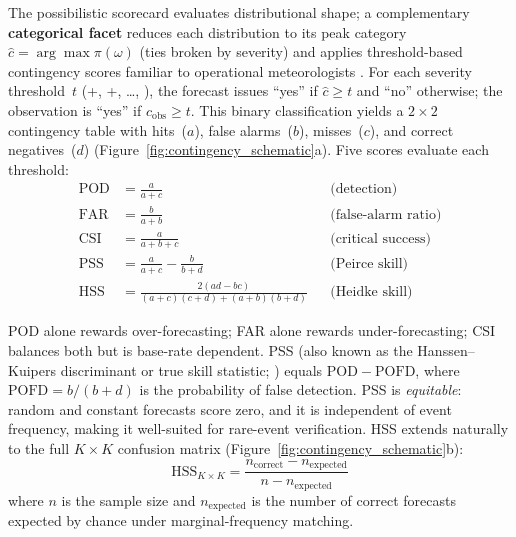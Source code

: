 The possibilistic scorecard evaluates distributional shape;
a complementary \textbf{categorical facet} reduces each
distribution to its peak category
$\hat{c} = \arg\max \pi(\omega)$ (ties broken by severity)
and applies threshold-based contingency scores familiar to
operational meteorologists
\citep{Jolliffe2003-xs,Wilks2011-vw}.
For each severity threshold~$t$ (+, +,
\ldots, ), the forecast issues ``yes'' if
$\hat{c} \geq t$ and ``no'' otherwise; the observation is
``yes'' if $c_{\mathrm{obs}} \geq t$.
This binary classification yields a $2 \times 2$ contingency
table with hits~($a$), false alarms~($b$), misses~($c$),
and correct negatives~($d$)
(Figure~\ref{fig:contingency_schematic}a).
Five scores evaluate each threshold:
\begin{align}
\mathrm{POD}  &= \frac{a}{a + c}
    &&\text{(detection)} \label{eq:pod} \\
\mathrm{FAR}  &= \frac{b}{a + b}
    &&\text{(false-alarm ratio)} \label{eq:far} \\
\mathrm{CSI}  &= \frac{a}{a + b + c}
    &&\text{(critical success)} \label{eq:csi} \\
\mathrm{PSS}  &= \frac{a}{a+c} - \frac{b}{b+d}
    &&\text{(Peirce skill)} \label{eq:pss} \\
\mathrm{HSS}  &= \frac{2(ad - bc)}{(a{+}c)(c{+}d) + (a{+}b)(b{+}d)}
    &&\text{(Heidke skill)} \label{eq:hss}
\end{align}

POD alone rewards over-forecasting; FAR alone rewards
under-forecasting; CSI balances both but is base-rate
dependent.
PSS (also known as the Hanssen--Kuipers discriminant or
true skill statistic; \citealt{Wilks2011-vw}) equals
$\mathrm{POD} - \mathrm{POFD}$,
where $\mathrm{POFD} = b/(b+d)$ is the probability of
false detection.
PSS is \textit{equitable}: random and constant forecasts
score zero, and it is independent of event frequency,
making it well-suited for rare-event verification.
HSS extends naturally to the full $K \times K$ confusion
matrix (Figure~\ref{fig:contingency_schematic}b):
\begin{equation}
\mathrm{HSS}_{K\times K}
  = \frac{n_{\mathrm{correct}} - n_{\mathrm{expected}}}%
         {n - n_{\mathrm{expected}}}
\label{eq:hss_kxk}
\end{equation}
where $n$ is the sample size and $n_{\mathrm{expected}}$ is
the number of correct forecasts expected by chance under
marginal-frequency matching.

